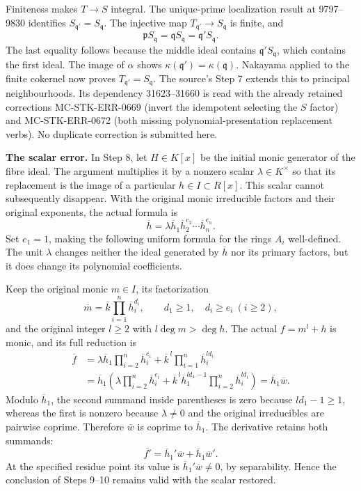 Finiteness makes \(T\to S\) integral. The unique-prime localization result at 9797--9830 identifies \(S_{\mathfrak q'}=S_{\mathfrak q}\). The injective map \(T_{\mathfrak q'}\to S_{\mathfrak q}\) is finite, and \[
\mathfrak pS_{\mathfrak q}
=\mathfrak qS_{\mathfrak q}
=\mathfrak q'S_{\mathfrak q}.
\] The last equality follows because the middle ideal contains \(\mathfrak q'S_{\mathfrak q}\), which contains the first ideal. The image of \(\alpha\) shows \(\kappa(\mathfrak q')=\kappa(\mathfrak q)\). Nakayama applied to the finite cokernel now proves \(T_{\mathfrak q'}=S_{\mathfrak q}\). The source's Step 7 extends this to principal neighbourhoods. Its dependency 31623--31660 is read with the already retained corrections MC-STK-ERR-0669 (invert the idempotent selecting the \(S\) factor) and MC-STK-ERR-0672 (both missing polynomial-presentation replacement verbs). No duplicate correction is submitted here.

\textbf{The scalar error.} In Step 8, let \(H\in K[x]\) be the initial monic generator of the fibre ideal. The argument multiplies it by a nonzero scalar \(\lambda\in K^\times\) so that its replacement is the image of a particular \(h\in I\subset R[x]\). This scalar cannot subsequently disappear. With the original monic irreducible factors and their original exponents, the actual formula is \[
\overline h
=\lambda\overline h_1\overline h_2^{e_2}\cdots\overline h_n^{e_n}.
\] Set \(e_1=1\), making the following uniform formula for the rings \(A_i\) well-defined. The unit \(\lambda\) changes neither the ideal generated by \(\overline h\) nor its primary factors, but it does change its polynomial coefficients.

Keep the original monic \(m\in I\), its factorization \[
\overline m=\overline k\prod_{i=1}^n\overline h_i^{d_i},
\qquad d_1\ge1,\quad d_i\ge e_i\ (i\ge2),
\] and the original integer \(l\ge2\) with \(l\deg m>\deg h\). The actual \(f=m^l+h\) is monic, and its full reduction is \[
\begin{aligned}
\overline f
&=\lambda\overline h_1\prod_{i=2}^n\overline h_i^{e_i}
 +\overline k^{\,l}\prod_{i=1}^n\overline h_i^{ld_i}\\
&=\overline h_1
\left(
\lambda\prod_{i=2}^n\overline h_i^{e_i}
+\overline k^{\,l}\overline h_1^{ld_1-1}
 \prod_{i=2}^n\overline h_i^{ld_i}
\right)
=\overline h_1\overline w.
\end{aligned}
\] Modulo \(\overline h_1\), the second summand inside parentheses is zero because \(ld_1-1\ge1\), whereas the first is nonzero because \(\lambda\ne0\) and the original irreducibles are pairwise coprime. Therefore \(\overline w\) is coprime to \(\overline h_1\). The derivative retains both summands: \[
\overline{f'}=\overline h_1'\overline w+\overline h_1\overline w'.
\] At the specified residue point its value is \(\overline h_1'\overline w\ne0\), by separability. Hence the conclusion of Steps 9--10 remains valid with the scalar restored.

